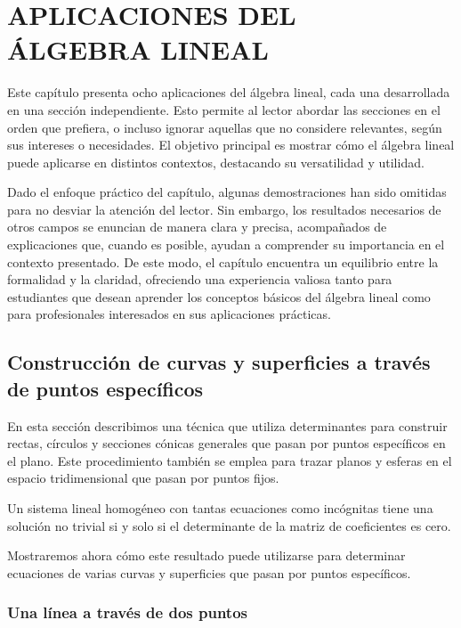 \chapter[APLICACIONES DEL ÁLGEBRA LINEAL]{APLICACIONES DEL \\ ÁLGEBRA LINEAL}

Este capítulo presenta ocho aplicaciones del álgebra lineal, cada una desarrollada en una sección independiente. Esto permite al lector abordar las secciones en el orden que prefiera, o incluso ignorar aquellas que no considere relevantes, según sus intereses o necesidades. El objetivo principal es mostrar cómo el álgebra lineal puede aplicarse en distintos contextos, destacando su versatilidad y utilidad.

Dado el enfoque práctico del capítulo, algunas demostraciones han sido omitidas para no desviar la atención del lector. Sin embargo, los resultados necesarios de otros campos se enuncian de manera clara y precisa, acompañados de explicaciones que, cuando es posible, ayudan a comprender su importancia en el contexto presentado. De este modo, el capítulo encuentra un equilibrio entre la formalidad y la claridad, ofreciendo una experiencia valiosa tanto para estudiantes que desean aprender los conceptos básicos del álgebra lineal como para profesionales interesados en sus aplicaciones prácticas.

\section{Construcción de curvas y superficies a través de puntos específicos}

En esta sección describimos una técnica que utiliza determinantes para construir rectas, círculos y secciones cónicas generales que pasan por puntos específicos en el plano. Este procedimiento también se emplea para trazar planos y esferas en el espacio tridimensional que pasan por puntos fijos.

\newpage

\begin{theorem}{}{}
    Un sistema lineal homogéneo con tantas ecuaciones como incógnitas tiene una solución no trivial si y solo si el determinante de la matriz de coeficientes es cero.
\end{theorem}

Mostraremos ahora cómo este resultado puede utilizarse para determinar ecuaciones de varias curvas y superficies que pasan por puntos específicos.

\subsection*{Una línea a través de dos puntos}

